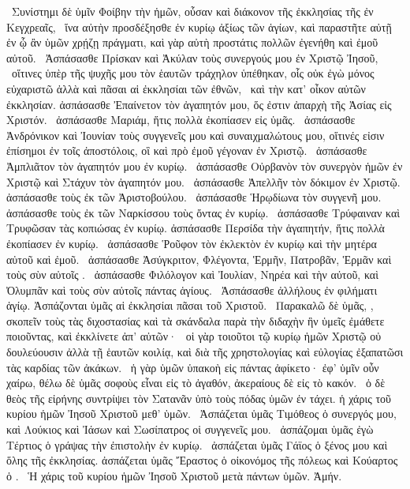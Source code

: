 ~Συνίστημι δὲ ὑμῖν Φοίβην τὴν  ἡμῶν, οὖσαν καὶ διάκονον τῆς ἐκκλησίας τῆς ἐν Κεγχρεαῖς,
~ἵνα αὐτὴν προσδέξησθε ἐν κυρίῳ ἀξίως τῶν ἁγίων, καὶ παραστῆτε αὐτῇ ἐν ᾧ ἂν ὑμῶν χρῄζῃ πράγματι, καὶ γὰρ αὐτὴ προστάτις πολλῶν ἐγενήθη καὶ ἐμοῦ αὐτοῦ.
~Ἀσπάσασθε Πρίσκαν καὶ Ἀκύλαν τοὺς συνεργούς μου ἐν Χριστῷ Ἰησοῦ,
~οἵτινες ὑπὲρ τῆς ψυχῆς μου τὸν ἑαυτῶν τράχηλον ὑπέθηκαν, οἷς οὐκ ἐγὼ μόνος εὐχαριστῶ ἀλλὰ καὶ πᾶσαι αἱ ἐκκλησίαι τῶν ἐθνῶν,
~καὶ τὴν κατ’ οἶκον αὐτῶν ἐκκλησίαν. ἀσπάσασθε Ἐπαίνετον τὸν ἀγαπητόν μου, ὅς ἐστιν ἀπαρχὴ τῆς Ἀσίας εἰς Χριστόν.
~ἀσπάσασθε Μαριάμ, ἥτις πολλὰ ἐκοπίασεν εἰς ὑμᾶς.
~ἀσπάσασθε Ἀνδρόνικον καὶ Ἰουνίαν τοὺς συγγενεῖς μου καὶ συναιχμαλώτους μου, οἵτινές εἰσιν ἐπίσημοι ἐν τοῖς ἀποστόλοις, οἳ καὶ πρὸ ἐμοῦ γέγοναν ἐν Χριστῷ.
~ἀσπάσασθε Ἀμπλιᾶτον τὸν ἀγαπητόν μου ἐν κυρίῳ.
~ἀσπάσασθε Οὐρβανὸν τὸν συνεργὸν ἡμῶν ἐν Χριστῷ καὶ Στάχυν τὸν ἀγαπητόν μου.
~ἀσπάσασθε Ἀπελλῆν τὸν δόκιμον ἐν Χριστῷ. ἀσπάσασθε τοὺς ἐκ τῶν Ἀριστοβούλου.
~ἀσπάσασθε Ἡρῳδίωνα τὸν συγγενῆ μου. ἀσπάσασθε τοὺς ἐκ τῶν Ναρκίσσου τοὺς ὄντας ἐν κυρίῳ.
~ἀσπάσασθε Τρύφαιναν καὶ Τρυφῶσαν τὰς κοπιώσας ἐν κυρίῳ. ἀσπάσασθε Περσίδα τὴν ἀγαπητήν, ἥτις πολλὰ ἐκοπίασεν ἐν κυρίῳ.
~ἀσπάσασθε Ῥοῦφον τὸν ἐκλεκτὸν ἐν κυρίῳ καὶ τὴν μητέρα αὐτοῦ καὶ ἐμοῦ.
~ἀσπάσασθε Ἀσύγκριτον, Φλέγοντα, Ἑρμῆν, Πατροβᾶν, Ἑρμᾶν καὶ τοὺς σὺν αὐτοῖς .
~ἀσπάσασθε Φιλόλογον καὶ Ἰουλίαν, Νηρέα καὶ τὴν  αὐτοῦ, καὶ Ὀλυμπᾶν καὶ τοὺς σὺν αὐτοῖς πάντας ἁγίους.
~Ἀσπάσασθε ἀλλήλους ἐν φιλήματι ἁγίῳ. Ἀσπάζονται ὑμᾶς αἱ ἐκκλησίαι πᾶσαι τοῦ Χριστοῦ.
~Παρακαλῶ δὲ ὑμᾶς, , σκοπεῖν τοὺς τὰς διχοστασίας καὶ τὰ σκάνδαλα παρὰ τὴν διδαχὴν ἣν ὑμεῖς ἐμάθετε ποιοῦντας, καὶ ἐκκλίνετε ἀπ’ αὐτῶν·
~οἱ γὰρ τοιοῦτοι τῷ κυρίῳ ἡμῶν Χριστῷ οὐ δουλεύουσιν ἀλλὰ τῇ ἑαυτῶν κοιλίᾳ, καὶ διὰ τῆς χρηστολογίας καὶ εὐλογίας ἐξαπατῶσι τὰς καρδίας τῶν ἀκάκων.
~ἡ γὰρ ὑμῶν ὑπακοὴ εἰς πάντας ἀφίκετο· ἐφ’ ὑμῖν οὖν χαίρω, θέλω δὲ ὑμᾶς σοφοὺς εἶναι εἰς τὸ ἀγαθόν, ἀκεραίους δὲ εἰς τὸ κακόν.
~ὁ δὲ θεὸς τῆς εἰρήνης συντρίψει τὸν Σατανᾶν ὑπὸ τοὺς πόδας ὑμῶν ἐν τάχει. ἡ χάρις τοῦ κυρίου ἡμῶν Ἰησοῦ Χριστοῦ μεθ’ ὑμῶν.
~Ἀσπάζεται ὑμᾶς Τιμόθεος ὁ συνεργός μου, καὶ Λούκιος καὶ Ἰάσων καὶ Σωσίπατρος οἱ συγγενεῖς μου.
~ἀσπάζομαι ὑμᾶς ἐγὼ Τέρτιος ὁ γράψας τὴν ἐπιστολὴν ἐν κυρίῳ.
~ἀσπάζεται ὑμᾶς Γάϊος ὁ ξένος μου καὶ ὅλης τῆς ἐκκλησίας. ἀσπάζεται ὑμᾶς Ἔραστος ὁ οἰκονόμος τῆς πόλεως καὶ Κούαρτος ὁ .
~Ἡ χάρις τοῦ κυρίου ἡμῶν Ἰησοῦ Χριστοῦ μετὰ πάντων ὑμῶν. Ἀμήν.

